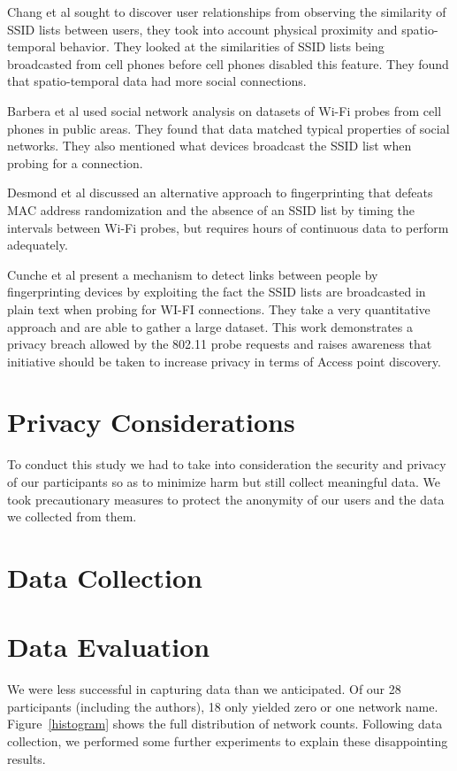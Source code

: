 \documentclass[letterpaper,twocolumn,10pt]{article}
\begin{document}
Chang et al  sought to discover user relationships from observing the similarity of SSID lists between users, they took into account physical proximity and spatio-temporal behavior. They looked at the similarities of SSID lists being broadcasted from cell phones before cell phones disabled this feature. They found that spatio-temporal data had more social connections. 

Barbera et al  used social network analysis on datasets of Wi-Fi probes from cell phones in public areas. They found that data matched typical properties of social networks. They also mentioned what devices broadcast the SSID list when probing for a connection.

Desmond et al discussed an alternative approach to fingerprinting that defeats MAC address 
randomization and the absence of an SSID list by timing the intervals between Wi-Fi probes, but requires hours of continuous data to perform adequately.

Cunche et al  present a mechanism to detect links between people by fingerprinting devices by exploiting the fact the SSID lists are broadcasted in plain text when probing for WI-FI connections. They take a very quantitative approach and are able to gather a large dataset. This work demonstrates a privacy breach allowed by the 802.11 probe requests and raises awareness that initiative should be taken to increase privacy in terms of Access point discovery. 





\section{Privacy Considerations}
To conduct this study we had to take into consideration the security and privacy of our participants so as to minimize harm but still collect meaningful data. We took precautionary measures to protect the anonymity of our users and the data we collected from them.



\section{Data Collection}


\section{Data Evaluation}
We were less successful in capturing data than we anticipated. Of our 28 participants (including the authors), 18 only yielded zero or one network name. Figure~\ref{histogram} shows the full distribution of network counts. Following data collection, we performed some further experiments to explain these disappointing results.
\end{document}
